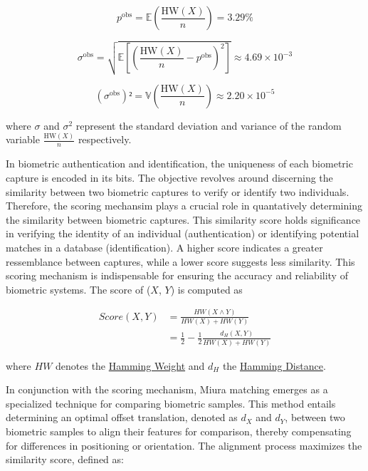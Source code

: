 \begin{equation} \label{eq:proba1}
    p^{\text{obs}} = \mathbb{E}\left( \frac{\text{HW}(X)}{n} \right) = 3.29\%
\end{equation}

\begin{equation} \label{eq:proba2}
    \sigma^{\text{obs}} = \sqrt{\mathbb{E} \left[ \left( \frac{\text{HW}(X)}{n} - p^{\text{obs}} \right)^2 \right]} \approx 4.69 \times 10^{-3}
\end{equation}


\begin{equation} \label{eq:proba3}
    (\sigma^{\text{obs}})² = \mathbb{V}\left( \frac{\text{HW}(X)}{n} \right)  \approx 2.20 \times 10^{-5}
\end{equation}

where \( \sigma \) and \( \sigma^2 \) represent the standard deviation and variance of the random variable \(\frac{\text{HW}(X)}{n}\) respectively.

In biometric authentication and identification, the uniqueness of each biometric capture is encoded in its bits. The objective revolves around discerning the similarity between two biometric captures to verify or identify two individuals. Therefore, the scoring mechansim plays a crucial role in quantatively determining the similarity between biometric captures. This similarity score holds significance in verifying the identity of an individual (authentication) or identifying potential matches in a database (identification). A higher score indicates a greater ressemblance between captures, while a lower score suggests less similarity. This scoring mechanism is indispensable for ensuring the accuracy and reliability of biometric systems. The score of (\(X\), \(Y\)) is computed as

\begin{equation} \label{eq:score}
    \begin{aligned}
        Score(X, Y) &= \frac{HW(X \land Y)}{HW(X) + HW(Y)}\\
        &= \frac{1}{2}-\frac{1}{2}\frac{d_H(X, Y)}{HW(X) + HW(Y)}
    \end{aligned}
\end{equation}

where \(HW\) denotes the \hyperref[def:Hamming Weight]{Hamming Weight} and \(d_H\) the \hyperref[def:Hamming Distance]{Hamming Distance}. 

In conjunction with the scoring mechanism, Miura matching emerges as a specialized technique for comparing biometric samples. This method entails determining an optimal offset translation, denoted as \(d_X\) and \(d_Y\), between two biometric samples to align their features for comparison, thereby compensating for differences in positioning or orientation. The alignment process maximizes the similarity score, defined as:

